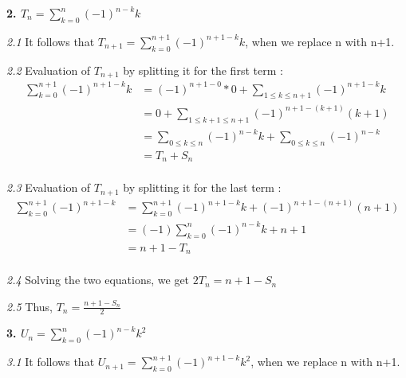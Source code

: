 \documentclass[12pt]{article}
\begin{document}
{\bf 2. $T_n = \sum\limits_{k=0} ^{n} (-1)^{n-k}k$}

{\textit {2.1} }It follows that $T_{n+1} = \sum\limits_{k=0} ^{n+1} (-1)^{n+1-k}k$, when we replace n with n+1.

{\textit {2.2}} Evaluation of $T_{n+1}$ by splitting it for the first term :
\begin{equation}\label{eq4}
                                  \begin{split}
                                     \sum\limits_{k=0} ^{n+1} (-1)^{n+1-k}k & = (-1)^{n+1-0} * 0 + \sum\limits_{1\leq k\leq n+1} (-1)^{n+1-k}k\\
                                       & =0 + \sum\limits_{1\leq k+1\leq n+1} (-1)^{n+1-(k+1)}(k+1) \\
                                       & =\sum\limits_{0\leq k\leq n} (-1)^{n-k}k + \sum\limits_{0\leq k\leq n} (-1)^{n-k}\\
                                       & =T_n + S_n\\
                                  \end{split}
                                \end{equation}

{\textit {2.3}} Evaluation of $T_{n+1}$ by splitting it for the last term :
\begin{equation}\label{eq5}
                                  \begin{split}
                                     \sum\limits_{k=0}^{n+1} (-1)^{n+1-k} & = \sum\limits_{k=0} ^{n+1} (-1)^{n+1-k}k + (-1)^{n+1-(n+1)}(n+1)\\
                                       & =(-1)\sum\limits_{k=0} ^{n} (-1)^{n-k}k + n+1 \\
                                       & =n+1-T_n\\
                                  \end{split}
                                \end{equation}

{\textit {2.4}} Solving the two equations, we get $2T_n = n+1 - S_n$

{\textit {2.5}} Thus, {\bf $T_n = \frac{n+1 -S_n}{2}$ }


{\bf 3. $U_n = \sum\limits_{k=0} ^{n} (-1)^{n-k}k^2$}

{\textit {3.1} }It follows that $U_{n+1} = \sum\limits_{k=0} ^{n+1} (-1)^{n+1-k}k^2$, when we replace n with n+1.
\end{document}
